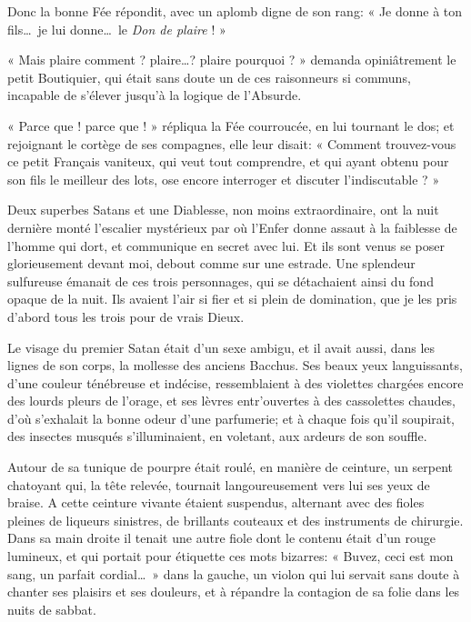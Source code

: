 Donc la bonne Fée répondit, avec un aplomb digne de son rang: « Je donne
à ton fils\ldots\ je lui donne\ldots\ le \textit{Don de plaire} ! »

« Mais plaire comment ? plaire\ldots ? plaire pourquoi ? » demanda
opiniâtrement le petit Boutiquier, qui était sans doute un de ces
raisonneurs si communs, incapable de s’élever
jusqu’à la logique de l’Absurde.

« Parce que ! parce que ! » répliqua la Fée courroucée, en lui tournant
le dos; et rejoignant le cortège de ses compagnes, elle leur disait: «
Comment trouvez{}-vous ce petit Français vaniteux, qui veut tout
comprendre, et qui ayant obtenu pour son fils le meilleur des lots, ose 
encore interroger et discuter l’indiscutable ? »


Deux superbes Satans et une Diablesse, non moins extraordinaire, ont la
nuit dernière monté l’escalier mystérieux par où
l’Enfer donne assaut à la faiblesse de
l’homme qui dort, et communique en secret avec lui. Et
ils sont venus se poser glorieusement devant moi, debout comme sur une
estrade. Une splendeur sulfureuse émanait de ces trois personnages, qui
se détachaient ainsi du fond opaque de la nuit. Ils avaient
l’air si fier et si plein de domination, que je les
pris d’abord tous les trois pour de vrais Dieux.

Le visage du premier Satan était d’un sexe ambigu, et
il avait aussi, dans les lignes de son corps, la mollesse des anciens
Bacchus. Ses beaux yeux languissants, d’une couleur
ténébreuse et indécise, ressemblaient à des violettes chargées encore
des lourds pleurs de l’orage, et ses lèvres
entr’ouvertes à des cassolettes chaudes,
d’où s’exhalait la bonne odeur
d’une parfumerie; et à chaque fois
qu’il soupirait, des insectes musqués
s’illuminaient, en voletant, aux ardeurs de son
souffle.

Autour de sa tunique de pourpre était roulé, en manière de ceinture, un
serpent chatoyant qui, la tête relevée, tournait langoureusement vers
lui ses yeux de braise. A cette ceinture vivante étaient suspendus,
alternant avec des fioles pleines de liqueurs sinistres, de brillants
couteaux et des instruments de chirurgie. Dans sa main droite il tenait
une autre fiole dont le contenu était d’un rouge
lumineux, et qui portait pour étiquette ces mots bizarres: « Buvez,
ceci est mon sang, un parfait cordial\ldots\ » dans la gauche, un violon qui
lui servait sans doute à chanter ses plaisirs et ses douleurs, et à
répandre la contagion de sa folie dans les nuits de sabbat.

